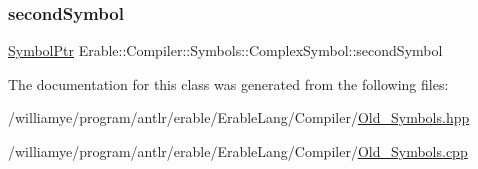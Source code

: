 \subsubsection{\texorpdfstring{secondSymbol}{secondSymbol}}
{\footnotesize\ttfamily \mbox{\hyperlink{namespace_erable_1_1_compiler_1_1_symbols_a8f0bc762f448ea4d84e8713ab3e140b9}{Symbol\+Ptr}} Erable\+::\+Compiler\+::\+Symbols\+::\+Complex\+Symbol\+::second\+Symbol}



The documentation for this class was generated from the following files\+:\begin{DoxyCompactItemize}
\item 
/williamye/program/antlr/erable/\+Erable\+Lang/\+Compiler/\mbox{\hyperlink{_old___symbols_8hpp}{Old\+\_\+\+Symbols.\+hpp}}\item 
/williamye/program/antlr/erable/\+Erable\+Lang/\+Compiler/\mbox{\hyperlink{_old___symbols_8cpp}{Old\+\_\+\+Symbols.\+cpp}}\end{DoxyCompactItemize}
